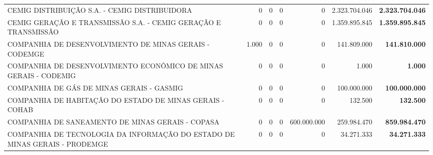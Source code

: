 \documentclass{article}
\begin{document}
\begin{longtable}[c]{m{5cm}|m{2cm}|m{2cm}|m{2cm}|m{2cm}|m{2cm}|m{2cm}}
\multicolumn{1}{L{5cm}|}{CEMIG DISTRIBUIÇÃO S.A. - CEMIG DISTRIBUIDORA} & \multicolumn{1}{r|}{         0} & \multicolumn{1}{r|}{     0} & \multicolumn{1}{r|}{         0} & \multicolumn{1}{r|}{          0} & \multicolumn{1}{r|}{2.323.704.046} & \multicolumn{1}{r}{ \textbf{2.323.704.046}} \\
\multicolumn{1}{L{5cm}|}{CEMIG GERAÇÃO E TRANSMISSÃO S.A. - CEMIG GERAÇÃO E TRANSMISSÃO} & \multicolumn{1}{r|}{         0} & \multicolumn{1}{r|}{     0} & \multicolumn{1}{r|}{         0} & \multicolumn{1}{r|}{          0} & \multicolumn{1}{r|}{1.359.895.845} & \multicolumn{1}{r}{ \textbf{1.359.895.845}} \\
\multicolumn{1}{L{5cm}|}{COMPANHIA DE DESENVOLVIMENTO DE MINAS GERAIS - CODEMGE} & \multicolumn{1}{r|}{1.000} & \multicolumn{1}{r|}{     0} & \multicolumn{1}{r|}{         0} & \multicolumn{1}{r|}{          0} & \multicolumn{1}{r|}{141.809.000} & \multicolumn{1}{r}{ \textbf{141.810.000}} \\
\multicolumn{1}{L{5cm}|}{COMPANHIA DE DESENVOLVIMENTO ECONÔMICO DE MINAS GERAIS - CODEMIG} & \multicolumn{1}{r|}{         0} & \multicolumn{1}{r|}{     0} & \multicolumn{1}{r|}{         0} & \multicolumn{1}{r|}{          0} & \multicolumn{1}{r|}{1.000} & \multicolumn{1}{r}{ \textbf{1.000}} \\
\multicolumn{1}{L{5cm}|}{COMPANHIA DE GÁS DE MINAS GERAIS - GASMIG} & \multicolumn{1}{r|}{         0} & \multicolumn{1}{r|}{     0} & \multicolumn{1}{r|}{         0} & \multicolumn{1}{r|}{          0} & \multicolumn{1}{r|}{100.000.000} & \multicolumn{1}{r}{ \textbf{100.000.000}} \\
\multicolumn{1}{L{5cm}|}{COMPANHIA DE HABITAÇÃO DO ESTADO DE MINAS GERAIS - COHAB} & \multicolumn{1}{r|}{         0} & \multicolumn{1}{r|}{     0} & \multicolumn{1}{r|}{         0} & \multicolumn{1}{r|}{          0} & \multicolumn{1}{r|}{132.500} & \multicolumn{1}{r}{ \textbf{132.500}} \\
\multicolumn{1}{L{5cm}|}{COMPANHIA DE SANEAMENTO DE MINAS GERAIS - COPASA} & \multicolumn{1}{r|}{         0} & \multicolumn{1}{r|}{     0} & \multicolumn{1}{r|}{         0} & \multicolumn{1}{r|}{600.000.000} & \multicolumn{1}{r|}{259.984.470} & \multicolumn{1}{r}{ \textbf{859.984.470}} \\
\multicolumn{1}{L{5cm}|}{COMPANHIA DE TECNOLOGIA DA INFORMAÇÃO DO ESTADO DE MINAS GERAIS - PRODEMGE} & \multicolumn{1}{r|}{         0} & \multicolumn{1}{r|}{     0} & \multicolumn{1}{r|}{         0} & \multicolumn{1}{r|}{          0} & \multicolumn{1}{r|}{34.271.333} & \multicolumn{1}{r}{ \textbf{34.271.333}} \\

\end{longtable}
\end{document}
